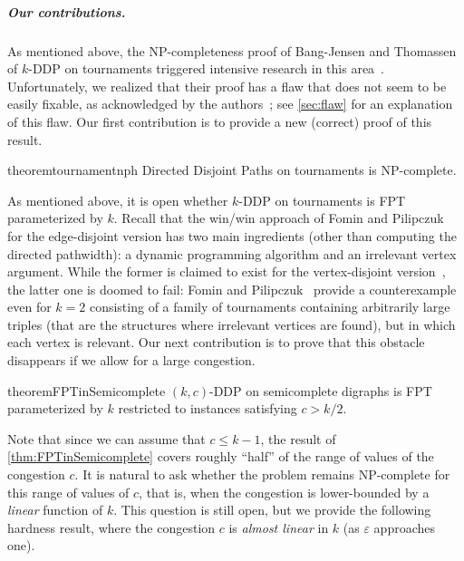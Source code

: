\documentclass[a4paper,UKenglish,cleveref, autoref, thm-restate]{lipics-v2021}
\renewcommand{\NP}{{\sf NP}\xspace}
\renewcommand{\FPT}{{\sf FPT}\xspace}
\newcommand{\pname}[1]{{\sc #1}}
\begin{document}
\subparagraph*{Our contributions.} As mentioned above, the \NP-completeness proof of
    Bang-Jensen and Thomassen~\cite{thomassen_tournament_nph} of $k$-{\sc DDP} on
    tournaments triggered intensive research in this
    area~\cite{FominP19,chudnovsky_union_of_tournaments,Disjoint-paths-in-tournaments}.
    Unfortunately, we realized that their proof has a flaw that does not seem to be
    easily fixable, as acknowledged by the authors~\cite{personal-communication}; see \autoref{sec:flaw} for an explanation of this flaw. Our
    first contribution is to provide a new (correct) proof of this result.


\begin{restatable}{theorem}{tournamentnph}\label{thm:tournament_nph}
    \pname{Directed Disjoint Paths} on tournaments is  \NP-complete.
\end{restatable}

As mentioned above, it is open whether $k$-{\sc DDP} on tournaments is \FPT
parameterized by $k$. Recall that the win/win approach of Fomin and
Pilipczuk~\cite{FominP19} for the edge-disjoint version has two main ingredients
(other than computing the directed pathwidth): a dynamic programming algorithm and an irrelevant
vertex argument. While the former is claimed to exist for the vertex-disjoint
version~\cite{FominP19}, the latter one is doomed to fail: Fomin and
Pilipczuk~\cite{FominP19} provide a counterexample even for $k=2$ consisting of a
family of tournaments containing arbitrarily large triples (that are the structures
where irrelevant vertices are found), but in which each vertex is relevant. Our next
contribution is to prove that this obstacle disappears if we allow for a large
congestion.

\begin{restatable}{theorem}{FPTinSemicomplete}
\label{thm:FPTinSemicomplete}
$(k,c)$-{\sc DDP} on semicomplete digraphs is \FPT parameterized by $k$ restricted
  to instances satisfying $c > k/2$.
\end{restatable}

Note that since we can assume that $c \leq k -1$, the result of \autoref{thm:FPTinSemicomplete}
covers roughly ``half'' of the range of values of the congestion $c$. It is natural
to ask whether the problem remains \NP-complete for this range of values of $c$, that
is, when the congestion is lower-bounded by a {\sl linear} function of $k$.
This question is still open, but we provide the following hardness result, where the
congestion $c$ is {\sl almost linear} in $k$ (as $\varepsilon$ approaches one).
\end{document}

